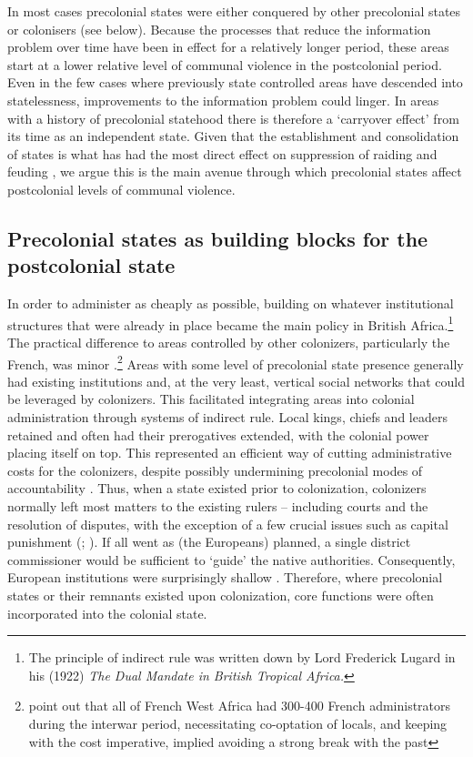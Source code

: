 In most cases precolonial states were either conquered by other precolonial
states or colonisers (see below). Because the processes that reduce the
information problem over time have been in effect for a relatively longer
period, these areas start at a lower relative level of communal violence in the
postcolonial period. Even in the few cases where previously state controlled
areas have descended into statelessness, improvements to the information problem
could linger. In areas with a history of precolonial statehood there is
therefore a `carryover effect' from its time as an independent state. Given that
the establishment and consolidation of states is what has had the most direct
effect on suppression of raiding and feuding \citep{Pinker2012}, we argue this
is the main avenue through which precolonial states affect postcolonial levels
of communal violence.

\subsection{Precolonial states as building blocks for the postcolonial state}
\label{Precolonial states as building blocks for the postcolonial state}

In order to administer as cheaply as possible, building on whatever
institutional structures that were already in place became the main policy in
British Africa.\footnote{The principle of indirect rule was written down by Lord
	Frederick Lugard in his (1922) \textit{The Dual Mandate in British
	Tropical Africa.}} The practical difference to areas controlled by other
	colonizers, particularly the French, was minor
	\citep{boone2014property}.\footnote{\citet[31]{englebert2013inside}
		point out that all of French West Africa had 300-400 French
		administrators during the interwar period, necessitating
		co-optation of locals, and keeping with the cost imperative,
	implied avoiding a strong break with the past} Areas with some level of
	precolonial state presence generally had existing institutions and, at
	the very least, vertical social networks that could be leveraged by
	colonizers. This facilitated integrating areas into colonial
	administration through systems of indirect rule. Local kings, chiefs and
	leaders retained and often had their prerogatives extended, with the
	colonial power placing itself on top. This represented an efficient way
	of cutting administrative costs for the colonizers, despite possibly
	undermining precolonial modes of accountability
	\citep{mamdani1996citizen}. Thus, when a state existed prior to
	colonization, colonizers normally left most matters to the existing
	rulers -- including courts and the resolution of disputes, with the
	exception of a few crucial issues such as capital punishment
	(\citealp{boone2014property}; \citealp[30]{englebert2013inside}). If all
	went as (the Europeans) planned, a single district commissioner would be
	sufficient to `guide' the native authorities. Consequently, European
	institutions were surprisingly shallow \citep[25]{englebert2013inside}.
	Therefore, where precolonial states or their remnants existed upon
	colonization, core functions were often incorporated into the colonial
	state.

